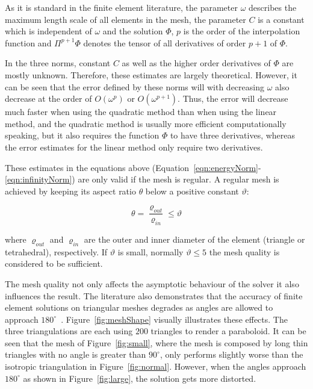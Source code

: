As it is standard in the finite element literature, the parameter $\omega$ describes the maximum length scale of all elements in the mesh, the parameter $C$ is a constant which is independent of $\omega$ and the solution $\Phi$, $p$ is the order of the interpolation function and $\Pi^{p+1}\Phi$ denotes the tensor of all derivatives of order $p+1$ of $\Phi$.

In the three norms, constant $C$ as well as the higher order derivatives of $\Phi$ are mostly unknown. Therefore, these estimates are largely theoretical. However, it can be seen that the error defined by these norms will with decreasing $\omega$ also decrease at the order of $O(\omega^{p})$ or $O(\omega^{p+1})$. Thus, the error will decrease much faster when using the quadratic method than when using the linear method, and the quadratic method is usually more efficient computationally speaking, but it also requires the function $\Phi$ to have three derivatives, whereas the error estimates for the linear method only require two derivatives. 

These estimates in the equations above (Equation~\ref{eqn:energyNorm}-\ref{eqn:infinityNorm}) are only valid if the mesh is regular. A regular mesh is achieved by keeping its aspect ratio $\theta$ below a positive constant $\vartheta$:

\begin{equation}
	\theta = \frac{\varrho_{out}}{\varrho_{in}} \leq \vartheta
\end{equation}

where $\varrho_{out}$ and $\varrho_{in}$ are the outer and inner diameter of the element (triangle or tetrahedral), respectively. If $\vartheta$ is small, normally $\vartheta\leq 5$ the mesh quality is considered to be sufficient.

The mesh quality not only affects the asymptotic behaviour of the solver it also influences the result. The literature also demonstrates that the accuracy of finite element solutions on triangular meshes degrades as angles are allowed to approach $180^{\circ}$~\cite{Babuska1976,Cheng2012}. Figure~\ref{fig:meshShape} visually illustrates these effects. The three triangulations are each using $200$ triangles to render a paraboloid. It can be seen that the mesh of Figure~\ref{fig:small}, where the mesh is composed by long thin triangles with no angle is greater than $90^{\circ}$, only performs slightly worse than the isotropic triangulation in Figure~\ref{fig:normal}. However, when the angles approach $180^{\circ}$ as shown in Figure~\ref{fig:large}, the solution gets more distorted. 

